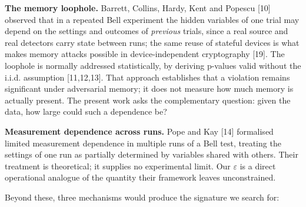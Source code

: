 \documentclass[
  11pt,
]{article}
\begin{document}
\textbf{The memory loophole.} Barrett, Collins, Hardy, Kent and Popescu
{[}10{]} observed that in a repeated Bell experiment the hidden
variables of one trial may depend on the settings and outcomes of
\emph{previous} trials, since a real source and real detectors carry
state between runs; the same reuse of stateful devices is what makes
memory attacks possible in device-independent cryptography {[}19{]}. The
loophole is normally addressed statistically, by deriving p-values valid
without the i.i.d. assumption {[}11,12,13{]}. That approach establishes
that a violation remains significant under adversarial memory; it does
not measure how much memory is actually present. The present work asks
the complementary question: given the data, how large could such a
dependence be?

\textbf{Measurement dependence across runs.} Pope and Kay {[}14{]}
formalised limited measurement dependence in multiple runs of a Bell
test, treating the settings of one run as partially determined by
variables shared with others. Their treatment is theoretical; it
supplies no experimental limit. Our \(\varepsilon\) is a direct
operational analogue of the quantity their framework leaves
unconstrained.

Beyond these, three mechanisms would produce the signature we search
for:
\end{document}
